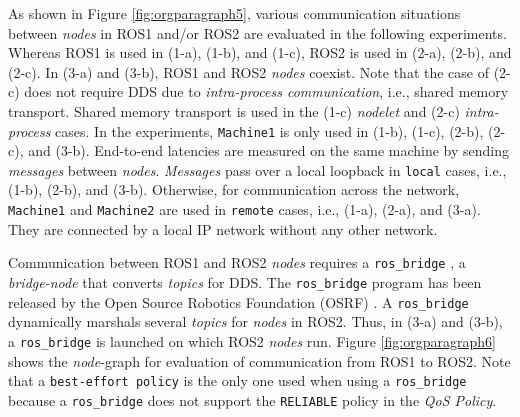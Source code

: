 \documentclass{sig-alternate-05-2015}
\begin{document}


As shown in Figure \ref{fig:orgparagraph5}, various communication situations between \emph{nodes} in ROS1 and/or ROS2 are evaluated in the following experiments.
Whereas ROS1 is used in (1-a), (1-b), and (1-c), ROS2 is used in (2-a), (2-b), and (2-c). 
In (3-a) and (3-b), ROS1 and ROS2 \emph{nodes} coexist.
Note that the case of (2-c) does not require DDS due to \emph{intra-process communication}, i.e., shared memory transport.
Shared memory transport is used in the (1-c) \emph{nodelet} and (2-c) \emph{intra-process} cases.
In the experiments, \texttt{Machine1} is only used in (1-b), (1-c), (2-b), (2-c), and (3-b).
End-to-end latencies are measured on the same machine by sending \emph{messages} between \emph{nodes}.
\emph{Messages} pass over a local loopback in \texttt{local} cases, i.e.,  (1-b), (2-b), and (3-b).
Otherwise, for communication across the network, \texttt{Machine1} and \texttt{Machine2} are used in \texttt{remote} cases, i.e., (1-a), (2-a), and (3-a).
They are connected by a local IP network without any other network.

Communication between ROS1 and ROS2 \emph{nodes} requires a \texttt{ros\_bridge} \cite{ros2@roscon2015}, a \emph{bridge-node} that converts \emph{topics} for DDS. 
The \texttt{ros\_bridge} program has been released by the Open Source Robotics Foundation (OSRF) \cite{osrf}.
A \texttt{ros\_bridge} dynamically marshals several \emph{topics} for \emph{nodes} in ROS2. 
Thus, in (3-a) and (3-b), a \texttt{ros\_bridge} is launched on which ROS2 \emph{nodes} run.
Figure \ref{fig:orgparagraph6} shows the \emph{node}-graph for evaluation of communication from ROS1 to ROS2.
Note that a \texttt{best-effort policy} is the only one used when using a \texttt{ros\_bridge} because a \texttt{ros\_bridge} does not support the \texttt{RELIABLE} policy in the \emph{QoS Policy}. 

\end{document}
